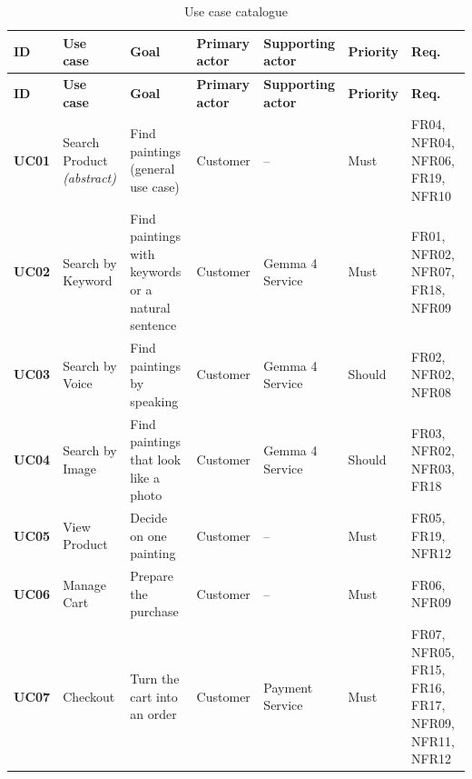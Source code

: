 \begin{longtable}{@{}P{1.0cm}P{3.0cm}P{3.8cm}P{2.2cm}P{2.0cm}P{1.2cm}P{1.3cm}@{}}
\caption{Use case catalogue}\label{tab:usecases}\\
\toprule
\footnotesize \textbf{ID} & \footnotesize \textbf{Use case} & \footnotesize \textbf{Goal} & \footnotesize \textbf{Primary actor} & \footnotesize \textbf{Supporting actor} & \footnotesize \textbf{Priority} & \footnotesize \textbf{Req.}\\
\midrule
\endfirsthead
\toprule
\footnotesize \textbf{ID} & \footnotesize \textbf{Use case} & \footnotesize \textbf{Goal} & \footnotesize \textbf{Primary actor} & \footnotesize \textbf{Supporting actor} & \footnotesize \textbf{Priority} & \footnotesize \textbf{Req.}\\
\midrule
\endhead
\bottomrule
\endlastfoot
\footnotesize \textbf{UC01} & \footnotesize Search Product \emph{(abstract)} & \footnotesize Find paintings (general use case) & \footnotesize Customer & \footnotesize -- & \footnotesize Must & \footnotesize FR04, NFR04, NFR06, FR19, NFR10\\
\footnotesize \textbf{UC02} & \footnotesize Search by Keyword & \footnotesize Find paintings with keywords or a natural sentence & \footnotesize Customer & \footnotesize Gemma 4 Service & \footnotesize Must & \footnotesize FR01, NFR02, NFR07, FR18, NFR09\\
\footnotesize \textbf{UC03} & \footnotesize Search by Voice & \footnotesize Find paintings by speaking & \footnotesize Customer & \footnotesize Gemma 4 Service & \footnotesize Should & \footnotesize FR02, NFR02, NFR08\\
\footnotesize \textbf{UC04} & \footnotesize Search by Image & \footnotesize Find paintings that look like a photo & \footnotesize Customer & \footnotesize Gemma 4 Service & \footnotesize Should & \footnotesize FR03, NFR02, NFR03, FR18\\
\footnotesize \textbf{UC05} & \footnotesize View Product & \footnotesize Decide on one painting & \footnotesize Customer & \footnotesize -- & \footnotesize Must & \footnotesize FR05, FR19, NFR12\\
\footnotesize \textbf{UC06} & \footnotesize Manage Cart & \footnotesize Prepare the purchase & \footnotesize Customer & \footnotesize -- & \footnotesize Must & \footnotesize FR06, NFR09\\
\footnotesize \textbf{UC07} & \footnotesize Checkout & \footnotesize Turn the cart into an order & \footnotesize Customer & \footnotesize Payment Service & \footnotesize Must & \footnotesize FR07, NFR05, FR15, FR16, FR17, NFR09, NFR11, NFR12\\

\end{longtable}

